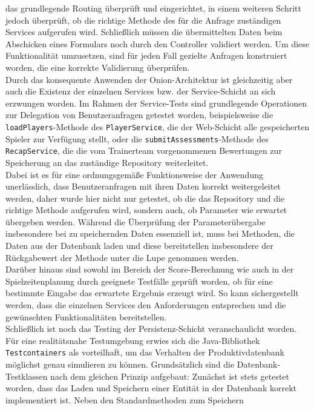 das grundlegende Routing überprüft und eingerichtet, in einem weiteren Schritt jedoch 
überprüft, ob die richtige Methode des für die Anfrage zuständigen Services aufgerufen 
wird. Schließlich müssen die übermittelten Daten beim Abschicken eines Formulars noch 
durch den Controller validiert werden. Um diese Funktionalität umzusetzen, sind für 
jeden Fall gezielte Anfragen konstruiert worden, die eine korrekte Validierung 
überprüfen. \\ 
Durch das konsequente Anwenden der Onion-Architektur ist gleichzeitig aber auch die 
Existenz der einzelnen Services bzw. der Service-Schicht an sich erzwungen worden. Im 
Rahmen der Service-Tests sind grundlegende Operationen zur Delegation von 
Benutzeranfragen getestet worden, beispielsweise die \texttt{loadPlayers}-Methode des 
\texttt{PlayerService}, die der Web-Schicht alle gespeicherten Spieler zur Verfügung 
stellt, oder die \texttt{submitAssessments}-Methode des \texttt{RecapService}, die die 
vom Trainerteam vorgenommenen Bewertungen zur Speicherung an das zuständige Repository 
weiterleitet. \\ 
Dabei ist es für eine ordnungsgemäße Funktionsweise der Anwendung unerlässlich, dass 
Benutzeranfragen mit ihren Daten korrekt weitergeleitet werden, daher wurde hier nicht 
nur getestet, ob die das Repository und die richtige Methode aufgerufen wird, sondern 
auch, ob Parameter wie erwartet übergeben werden. Während die Überprüfung der 
Parameterübergabe insbesondere bei zu speichernden Daten essenziell ist, muss bei 
Methoden, die Daten aus der Datenbank laden und diese bereitstellen insbesondere der 
Rückgabewert der Methode unter die Lupe genommen werden. \\ 
Darüber hinaus sind sowohl im Bereich der Score-Berechnung wie auch in der 
Spielzeitenplanung durch geeignete Testfälle geprüft worden, ob für eine bestimmte 
Eingabe das erwartete Ergebnis erzeugt wird. So kann sichergestellt werden, dass die 
einzelnen Services den Anforderungen entsprechen und die gewünschten Funktionalitäten 
bereitstellen. \\ 
Schließlich ist noch das Testing der Persistenz-Schicht veranschaulicht worden. Für 
eine realitätsnahe Testumgebung erwies sich die Java-Bibliothek \texttt{Testcontainers} 
als vorteilhaft, um das Verhalten der Produktivdatenbank möglichst genau simulieren 
zu können. Grundsätzlich sind die Datenbank-Testklassen nach dem gleichen Prinzip 
aufgebaut: Zunächst ist stets getestet worden, dass das Laden und Speichern einer Entität 
in der Datenbank korrekt implementiert ist. Neben den Standardmethoden zum Speichern 
